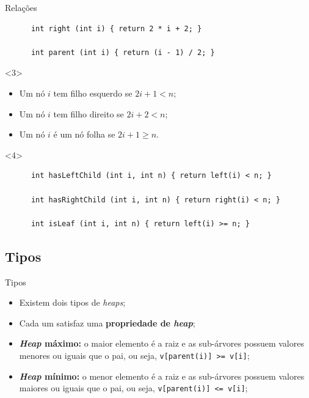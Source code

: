 \documentclass[t, 10pt]{beamer}
\begin{document}
\begin{frame}[fragile]{Relações}
\begin{onlyenv}
\begin{center}
\begin{minipage}{0.6\textwidth}
\begin{verbatim}
      int right (int i) { return 2 * i + 2; }
      
      int parent (int i) { return (i - 1) / 2; }
      \end{verbatim}
      \end{minipage}
      \end{center}
    \end{onlyenv}
    \begin{onlyenv}<3>
      \begin{itemize}
        \item Um nó $i$ tem filho esquerdo se $2i + 1 < n$;
        \item Um nó $i$ tem filho direito se $2i + 2 < n$;
        \item Um nó $i$ é um nó folha se $2i + 1 \geq n$.
      \end{itemize}
    \end{onlyenv}
    \begin{onlyenv}<4>
      \vspace{-1em}
      \begin{center}
      \begin{minipage}{0.8\textwidth}
      \begin{verbatim}
      int hasLeftChild (int i, int n) { return left(i) < n; }
      
      int hasRightChild (int i, int n) { return right(i) < n; }
      
      int isLeaf (int i, int n) { return left(i) >= n; }
      \end{verbatim}
      \end{minipage}
      \end{center}
    \end{onlyenv} 
  \end{frame}

  \subsection{Tipos}
  
  \begin{frame}{Tipos}
    \begin{itemize}
      \item Existem dois tipos de \emph{heaps};
      \item Cada um satisfaz uma \textbf{propriedade de \emph{heap}};
      \item<2-> \textbf{\emph{Heap} máximo:} o maior elemento é a raiz e as sub-árvores possuem valores
      menores ou iguais que o pai, ou seja, \texttt{v[parent(i)] >= v[i]};
      \item<3-> \textbf{\emph{Heap} mínimo:} o menor elemento é a raiz e as sub-árvores possuem valores
      maiores ou iguais que o pai, ou seja, \texttt{v[parent(i)] <= v[i]};
    \end{itemize}
  \end{frame}
  
\end{document}
